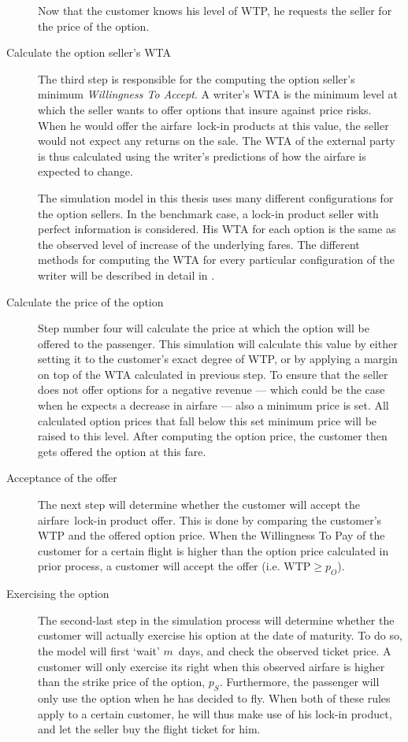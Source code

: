 \begin{description}
Now that the customer knows his level of WTP, he requests the seller for the price of the option.

\item[Calculate the option seller's WTA] The third step is responsible for the computing the option seller's minimum \emph{Willingness To Accept}. A writer's WTA is the minimum level at which the seller wants to offer options that insure against price risks. When he would offer the airfare~lock-in products at this value, the seller would not expect any returns on the sale. The WTA of the external party is thus calculated using the writer's predictions of how the airfare is expected to change.

The simulation model in this thesis uses many different configurations for the option sellers. In the benchmark case, a lock-in product seller with perfect information is considered. His WTA for each option is the same as the observed level of increase of the underlying fares. The different methods for computing the WTA for every particular configuration of the writer will be described in detail in .

\item[Calculate the price of the option] Step number four will calculate the price at which the option will be offered to the passenger. This simulation will calculate this value by either setting it to the customer's exact degree of WTP, or by applying a margin on top of the WTA calculated in previous step. To ensure that the seller does not offer options for a negative revenue --- which could be the case when he expects a decrease in airfare --- also a minimum price is set. All calculated option prices that fall below this set minimum price will be raised to this level. After computing the option price, the customer then gets offered the option at this fare.

\item[Acceptance of the offer] The next step will determine whether the customer will accept the airfare~lock-in product offer. This is done by comparing the customer's WTP and the offered option price. When the Willingness To Pay of the customer for a certain flight is higher than the option price calculated in prior process, a customer will accept the offer (i.e. $\text{WTP} \ge p_O$).

\item[Exercising the option] The second-last step in the simulation process will determine whether the customer will actually exercise his option at the date of maturity. To do so, the model will first `wait' $m$~days, and check the observed ticket price. A customer will only exercise its right when this observed airfare is higher than the strike price of the option, $p_S$. Furthermore, the passenger will only use the option when he has decided to fly. When both of these rules apply to a certain customer, he will thus make use of his lock-in product, and let the seller buy the flight ticket for him.


\end{description}
